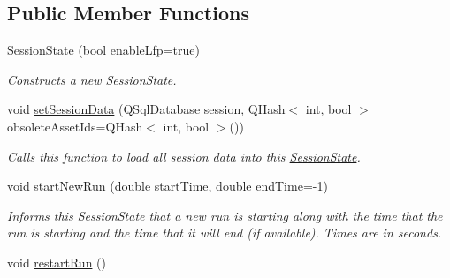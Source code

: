 \subsection*{Public Member Functions}
\begin{DoxyCompactItemize}
\item 
\hyperlink{class_picto_1_1_session_state_af0e7c8888794eb8edff9d3764d12a679}{Session\-State} (bool \hyperlink{class_picto_1_1_session_state_adbb4217793c27b4adcf2163d9bfa8a88}{enable\-Lfp}=true)
\begin{DoxyCompactList}\small\item\em Constructs a new \hyperlink{class_picto_1_1_session_state}{Session\-State}. \end{DoxyCompactList}\item 
void \hyperlink{class_picto_1_1_session_state_a54ef9957c7c3f166de6bcc76f61b65f9}{set\-Session\-Data} (Q\-Sql\-Database session, Q\-Hash$<$ int, bool $>$ obsolete\-Asset\-Ids=Q\-Hash$<$ int, bool $>$())
\begin{DoxyCompactList}\small\item\em Calls this function to load all session data into this \hyperlink{class_picto_1_1_session_state}{Session\-State}. \end{DoxyCompactList}\item 
void \hyperlink{class_picto_1_1_session_state_af2ce593d4016bd0e29ba90ba32cb3e15}{start\-New\-Run} (double start\-Time, double end\-Time=-\/1)
\begin{DoxyCompactList}\small\item\em Informs this \hyperlink{class_picto_1_1_session_state}{Session\-State} that a new run is starting along with the time that the run is starting and the time that it will end (if available). Times are in seconds. \end{DoxyCompactList}\item 
\hypertarget{class_picto_1_1_session_state_a9538e5aed32615b554ecf31d35b96ff7}{void \hyperlink{class_picto_1_1_session_state_a9538e5aed32615b554ecf31d35b96ff7}{restart\-Run} ()}\label{class_picto_1_1_session_state_a9538e5aed32615b554ecf31d35b96ff7}


\end{DoxyCompactItemize}

